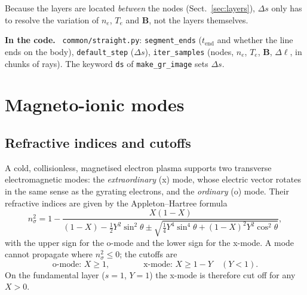 \documentclass[11pt,a4paper]{article}
\newcommand{\code}[1]{\texttt{#1}}
\newcommand{\vect}[1]{\bm{#1}}
\newenvironment{incode}{\par\smallskip\noindent\begin{minipage}{\linewidth}\small\color{accent!80!black}\textbf{In the code.}~}{\end{minipage}\par\smallskip}
\begin{document}
Because the layers are located \emph{between} the nodes (Sect.~\ref{sec:layers}), $\Delta s$
only has to resolve the variation of $n_e$, $T_e$ and $\vect B$, not the layers themselves.

\begin{incode}
\code{common/straight.py}: \code{segment\_ends} ($t_\text{end}$ and whether the line ends on the
body), \code{default\_step} ($\Delta s$), \code{iter\_samples} (nodes, $n_e$, $T_e$, $\vect B$,
$\Delta\ell$, in chunks of rays). The keyword \code{ds} of \code{make\_gr\_image} sets
$\Delta s$.
\end{incode}

\section{Magneto-ionic modes}\label{sec:modes}

\subsection{Refractive indices and cutoffs}
A cold, collisionless, magnetised electron plasma supports two transverse electromagnetic
modes: the \emph{extraordinary} (x) mode, whose electric vector rotates in the same sense as
the gyrating electrons, and the \emph{ordinary} (o) mode. Their refractive indices are given by
the Appleton--Hartree formula
\begin{equation}
  n_{\sigma}^2 = 1-\frac{X(1-X)}{(1-X)-\tfrac12Y^2\sin^2\theta\pm
     \sqrt{\tfrac14Y^4\sin^4\theta+(1-X)^2Y^2\cos^2\theta}},
  \label{eq:ah}
\end{equation}
with the upper sign for the o-mode and the lower sign for the x-mode. A mode cannot propagate
where $n_\sigma^2\le0$; the cutoffs are
\begin{equation}
  \text{o-mode: } X\ge1,\qquad\qquad \text{x-mode: } X\ge1-Y\quad(Y<1).
  \label{eq:cutoff}
\end{equation}
On the fundamental layer ($s=1$, $Y=1$) the x-mode is therefore cut off for any $X>0$.
\end{document}
